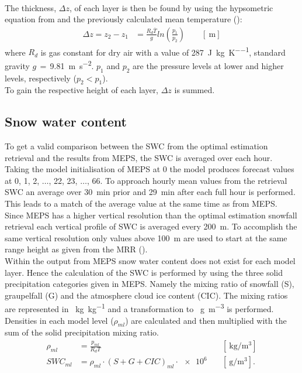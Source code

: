\\
The thickness, $\Delta z$, of each layer is then be found by using the hypsometric equation from \cite{martin_mid-latitude_2006} and the previously calculated mean temperature ():
\begin{equation}
	\begin{split}
		\Delta z  = z_2 - z_1 
		& = \frac{R_d \overline{T}}{g} ln\left(\frac{p_1}{p_2} \right) \qquad [\SI{}{\metre}]
	\end{split}
	\label{eq:hypsometric}
\end{equation}
where $R_d$ is gas constant for dry air with a value of \SI{287}{\joule\per\kilogram\per\kelvin},  standard gravity $g\,=\,$\SI{9.81}{\metre\per\square\second}. $p_1$ and $p_2$ are the pressure levels at lower and higher levels, respectively ($p_2 < p_1$).
\\
To gain the respective height of each layer, $\Delta z$ is summed.

\subsection{Snow water content}
To get a valid comparison between the SWC from the optimal estimation retrieval and the results from MEPS, the SWC is averaged over each hour. Taking the model initialisation of MEPS at \SI{0}{\UTC} the model produces forecast values at \SI{0}{}, \SI{1}{}, \SI{2}{}, $\ldots$, \SI{22}{}, \SI{23}{}, $\ldots$, \SI{66}{\UTC}. To approach hourly mean values from the retrieval SWC an average over \SI{30}{\minute} prior and \SI{29}{\minute} after each full hour is performed. This leads to a match of the average value at the same time as from MEPS. \\
Since MEPS has a higher vertical resolution than the optimal estimation snowfall retrieval each vertical profile of SWC is averaged every \SI{200}{\metre}. To accomplish the same vertical resolution only values above \SI{100}{\metre} are used to start at the same range height as given from the MRR ().
\\
Within the output from MEPS snow water content does not exist for each model layer. Hence the calculation of the SWC is performed by using the three solid precipitation categories given in MEPS. Namely the mixing ratio of snowfall (S), graupelfall (G) and the atmosphere cloud ice content (CIC). The mixing ratios are represented in \SI{}{\kg\per\kg} and a transformation to \SI{}{\g\per\cubic\meter} is performed. Densities in each model level ($\rho_{ml}$) are calculated and then multiplied with the sum of the solid precipitation mixing ratio. 
\begin{align}
	\rho_{ml} & = \frac{p_{ml}}{R_d T} & \quad [\SI{}{\kg\per\cubic\meter}]  \\
	SWC_{ml} & = \rho_{ml} \cdot (S + G + CIC)_{ml} \cdot \num{e6} & \quad [\SI{}{\g\per\cubic\meter}].
	\label{eq:SWC_ml}
\end{align}

